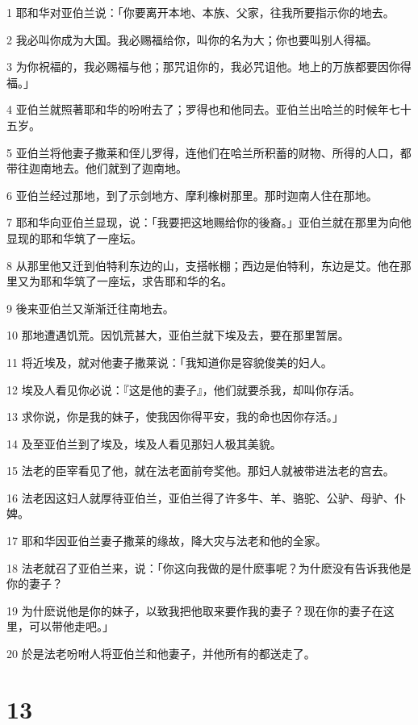 \par 1 耶和华对亚伯兰说：「你要离开本地、本族、父家，往我所要指示你的地去。
\par 2 我必叫你成为大国。我必赐福给你，叫你的名为大；你也要叫别人得福。
\par 3 为你祝福的，我必赐福与他；那咒诅你的，我必咒诅他。地上的万族都要因你得福。」
\par 4 亚伯兰就照著耶和华的吩咐去了；罗得也和他同去。亚伯兰出哈兰的时候年七十五岁。
\par 5 亚伯兰将他妻子撒莱和侄儿罗得，连他们在哈兰所积蓄的财物、所得的人口，都带往迦南地去。他们就到了迦南地。
\par 6 亚伯兰经过那地，到了示剑地方、摩利橡树那里。那时迦南人住在那地。
\par 7 耶和华向亚伯兰显现，说：「我要把这地赐给你的後裔。」亚伯兰就在那里为向他显现的耶和华筑了一座坛。
\par 8 从那里他又迁到伯特利东边的山，支搭帐棚；西边是伯特利，东边是艾。他在那里又为耶和华筑了一座坛，求告耶和华的名。
\par 9 後来亚伯兰又渐渐迁往南地去。
\par 10 那地遭遇饥荒。因饥荒甚大，亚伯兰就下埃及去，要在那里暂居。
\par 11 将近埃及，就对他妻子撒莱说：「我知道你是容貌俊美的妇人。
\par 12 埃及人看见你必说：『这是他的妻子』，他们就要杀我，却叫你存活。
\par 13 求你说，你是我的妹子，使我因你得平安，我的命也因你存活。」
\par 14 及至亚伯兰到了埃及，埃及人看见那妇人极其美貌。
\par 15 法老的臣宰看见了他，就在法老面前夸奖他。那妇人就被带进法老的宫去。
\par 16 法老因这妇人就厚待亚伯兰，亚伯兰得了许多牛、羊、骆驼、公驴、母驴、仆婢。
\par 17 耶和华因亚伯兰妻子撒莱的缘故，降大灾与法老和他的全家。
\par 18 法老就召了亚伯兰来，说：「你这向我做的是什麽事呢？为什麽没有告诉我他是你的妻子？
\par 19 为什麽说他是你的妹子，以致我把他取来要作我的妻子？现在你的妻子在这里，可以带他走吧。」
\par 20 於是法老吩咐人将亚伯兰和他妻子，并他所有的都送走了。

\chapter{13}

